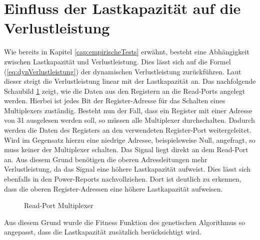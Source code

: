 \section{Einfluss der Lastkapazität auf die Verlustleistung}
 \label{cap:lastkapa}
Wie bereits in Kapitel \ref{cap:empirischeTests} erwähnt, besteht eine Abhängigkeit zwischen Lastkapazität und Verlustleistung. Dies lässt sich auf die Formel (\ref{eq:dynVerlustleistung}) der dynamischen Verlustleistung zurückführen. Laut dieser steigt die Verlustleistung linear mit der Lastkapazität an.
Das nachfolgende Schaubild \ref{fig:read_port_mux} zeigt, wie die Daten aus den Registern an die Read-Ports angelegt werden. Hierbei ist jedes Bit der Register-Adresse für das Schalten eines Multiplexers zuständig. Besteht nun der Fall, dass ein Register mit einer Adresse von 31 ausgelesen werden soll, so müssen alle Multiplexer durchschalten. Dadurch werden die Daten des Registers an den verwendeten Register-Port weitergeleitet. Wird im Gegensatz hierzu eine niedrige Adresse, beispielsweise Null, angefragt, so muss keiner der Multiplexer schalten. Das Signal liegt direkt an dem Read-Port an. Aus diesem Grund benötigen die oberen Adressleitungen mehr Verlustleistung, da das Signal eine höhere Lastkapazität aufweist. Dies lässt sich ebenfalls in den Power-Reports nachvollziehen. Dort ist deutlich zu erkennen, dass die oberen Register-Adressen eine höhere Lastkapazität aufweisen. 
\begin{scriptsize}
	\begin{figure}[htbp] 
		\centering
		
		\caption{Read-Port Multiplexer}
		\label{fig:read_port_mux}
	\end{figure}
\end{scriptsize}

Aus diesem Grund wurde die Fitness Funktion des genetischen Algorithmus so angepasst, dass die Lastkapazität zusätzlich berücksichtigt wird.

